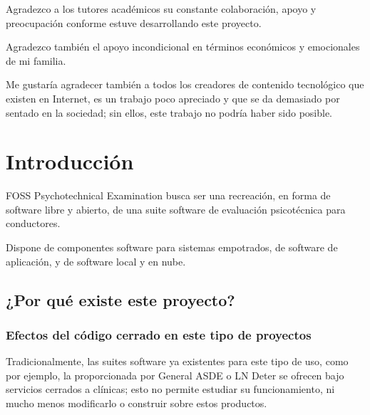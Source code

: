 \documentclass[12pt,a4paper,twoside,openright]{book}
\begin{document}
\begin{umaacknowledgments}
Agradezco a los tutores académicos su constante colaboración, apoyo y preocupación conforme estuve desarrollando este proyecto. 

Agradezco también el apoyo incondicional en términos económicos y emocionales de mi familia. 

Me gustaría agradecer también a todos los creadores de contenido tecnológico que existen en Internet, es un trabajo poco apreciado y que se da demasiado por sentado en la sociedad; sin ellos, este trabajo no podría haber sido posible. 
\end{umaacknowledgments}

\clearpage
\tableofcontents
\clearpage
\listoffigures
\clearpage
\listoftables
\clearpage


\clearpage

\mainmatter
\chapter{Introducción}

FOSS Psychotechnical Examination busca ser una recreación, en forma de software libre y abierto, de una suite software de evaluación psicotécnica para conductores.

Dispone de componentes software para sistemas empotrados, de software de aplicación, y de software local y en nube.

\section{¿Por qué existe este proyecto?}

\subsection{Efectos del código cerrado en este tipo de proyectos}

Tradicionalmente, las suites software ya existentes para este tipo de uso, como por ejemplo, la proporcionada por General ASDE o LN Deter se ofrecen bajo servicios cerrados a clínicas; esto no permite estudiar su funcionamiento, ni mucho menos modificarlo o construir sobre estos productos.
\end{document}
